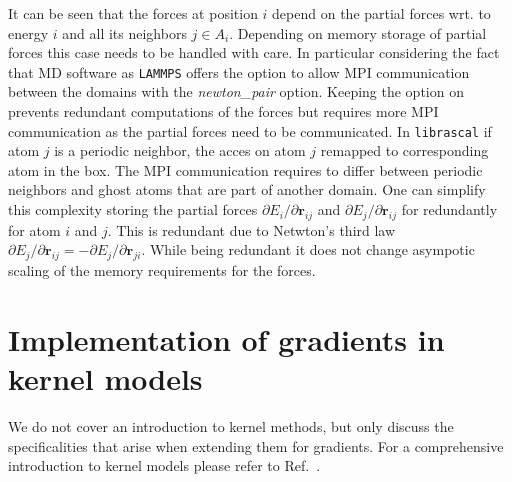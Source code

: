 It can be seen that the forces at position $i$ depend on the partial forces wrt. to energy $i$ and all its neighbors $j\in A_i$.
Depending on memory storage of partial forces this case needs to be handled with care.
In particular considering the fact that MD software as \texttt{LAMMPS} offers the option to allow MPI communication between the domains with the \emph{newton\_pair} option.
Keeping the option on prevents redundant computations of the forces but requires more MPI communication as the partial forces need to be communicated.
In \texttt{librascal} if atom $j$ is a periodic neighbor, the acces on atom $j$ remapped to corresponding atom in the box.
The MPI communication requires to differ between periodic neighbors and ghost atoms that are part of another domain.
One can simplify this complexity storing the partial forces $\partial{E_i}/\partial{\mathbf{r}_{ij}}$ and $\partial{E_j}/\partial{\mathbf{r}_{ij}}$ for redundantly for atom $i$ and $j$.
This is redundant due to Netwton's third law $\partial{E_j}/\partial{\mathbf{r}_{ij}} = - \partial{E_j}/\partial{\mathbf{r}_{ji}}$.
While being redundant it does not change asympotic scaling of the memory requirements for the forces.

\section{Implementation of gradients in kernel models}
We do not cover an introduction to kernel methods, but only discuss the specificalities that arise when extending them for gradients.
For a comprehensive introduction to kernel models please refer to Ref.~\cite{bishop2006pattern}.

